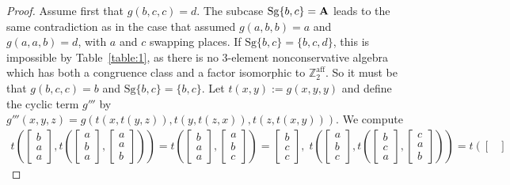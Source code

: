 \documentclass[11pt]{amsart}
\newcommand{\m}[1]{\mathbf{\uppercase{#1}}}
\theoremstyle{definition}
\theoremstyle{remark}
\theoremstyle{plain}
\begin{document}
\begin{enumerate}[wide, labelindent=0pt]
\begin{proof}
Assume first that $g(b,c,c)=d$. The subcase $\mathrm{Sg}\{b,c\}=\m a$ leads to the same contradiction as in the case that assumed $g(a,b,b)=a$ and $g(a,a,b)=d$, with $a$ and $c$ swapping places. If $\mathrm{Sg}\{b,c\}=\{b,c,d\}$, this is impossible by Table~\ref{table:1}, as there is no 3-element nonconservative algebra which has both a congruence class and a factor isomorphic to $\mathbb{Z}^{\text{aff}}_2$. So it must be that $g(b,c,c)=b$ and $\mathrm{Sg}\{b,c\}=\{b,c\}$. Let $t(x,y):=g(x,y,y)$ and define the cyclic term $g'''$ by $g'''(x,y,z)=g(t(x,t(y,z)),t(y,t(z,x)),t(z,t(x,y))).$ We compute 
$$
\begin{gathered}
t\left(
\begin{bmatrix}
b \\
a \\
a
\end{bmatrix}\!,
t\left(
\begin{bmatrix}
a \\
b \\
a
\end{bmatrix}\!,\!
\begin{bmatrix}
a \\
a \\
b
\end{bmatrix}
\right)\right)=t\left(
\begin{bmatrix}
b \\
a \\
a
\end{bmatrix}\!,\!
\begin{bmatrix}
a \\
b \\
c
\end{bmatrix}
\right)=
\begin{bmatrix}
b \\
c \\
c
\end{bmatrix},
\;
t\left(
\begin{bmatrix}
a \\
b \\
c
\end{bmatrix}\!,
t\left(
\begin{bmatrix}
b \\
c \\
a
\end{bmatrix}\!,\!
\begin{bmatrix}
c \\
a \\
b
\end{bmatrix}
\right)\right)=t\left(
\begin{bmatrix}

\end{bmatrix}
\end{gathered}$$
\end{proof}
\end{enumerate}
\end{document}
